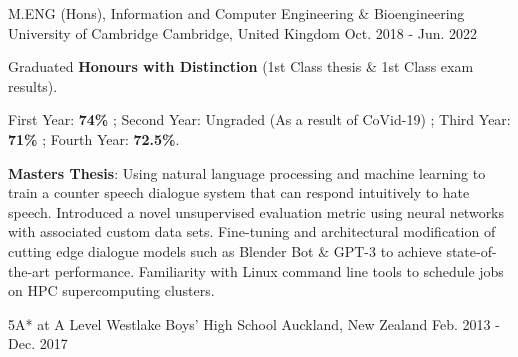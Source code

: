 

\begin{cventries}

  \cventry
    {M.ENG (Hons), Information and Computer Engineering \& Bioengineering} %
    {University of Cambridge} %
    {Cambridge, United Kingdom} %
    {Oct. 2018 - Jun. 2022} %
    {
      \begin{cvitems} %
        \item {Graduated \textbf{Honours with Distinction} (1st Class thesis \& 1st Class exam results).}
        \item {First Year: \textbf{74\%} ; Second Year: Ungraded (As a result of CoVid-19) ; Third Year: \textbf{71\%} ; Fourth Year: \textbf{72.5\%}.}
        \item {\textbf{Masters Thesis}: Using natural language processing and machine learning to train a counter speech dialogue system that can respond intuitively to hate speech. Introduced a novel unsupervised evaluation metric using neural networks with associated custom data sets. Fine-tuning and architectural modification of cutting edge dialogue models such as Blender Bot \& GPT-3 to achieve state-of-the-art performance. Familiarity with Linux command line tools to schedule jobs on HPC supercomputing clusters.}
      \end{cvitems}
    }

  \cventry
    {5A* at A Level} %
    {Westlake Boys' High School} %
    {Auckland, New Zealand} %
    {Feb. 2013 - Dec. 2017} %
    {}

\end{cventries}
